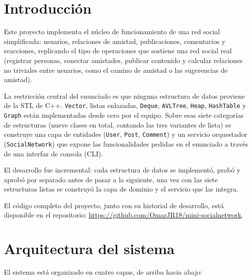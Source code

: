 \documentclass[11pt,a4paper]{article}
\begin{document}
\newpage
\newpage

\tableofcontents
\newpage

\section{Introducción}

Este proyecto implementa el núcleo de funcionamiento de una red social
simplificada: usuarios, relaciones de amistad, publicaciones, comentarios
y reacciones, replicando el tipo de operaciones que sostiene una red
social real (registrar personas, conectar amistades, publicar contenido y
calcular relaciones no triviales entre usuarios, como el camino de
amistad o las sugerencias de amistad).

La restricción central del enunciado es que ninguna estructura de datos
proviene de la STL de C++. \texttt{Vector}, listas enlazadas,
\texttt{Deque}, \texttt{AVLTree}, \texttt{Heap}, \texttt{HashTable} y
\texttt{Graph} están implementadas desde cero por el equipo. Sobre esas
siete categorías de estructuras (nueve clases en total, contando las
tres variantes de lista) se construye una capa de entidades (\texttt{User},
\texttt{Post}, \texttt{Comment}) y un servicio orquestador
(\texttt{SocialNetwork}) que expone las funcionalidades pedidas en el
enunciado a través de una interfaz de consola (CLI).

El desarrollo fue incremental: cada estructura de datos se implementó,
probó y aprobó por separado antes de pasar a la siguiente, una vez con
las siete estructuras listas se construyó la capa de dominio y el
servicio que las integra.

El código completo del proyecto, junto con su historial de desarrollo,
está disponible en el repositorio:
\url{https://github.com/OmarJR18/mini-socialnetwork}.

\section{Arquitectura del sistema}

El sistema está organizado en cuatro capas, de arriba hacia abajo:
\end{document}
